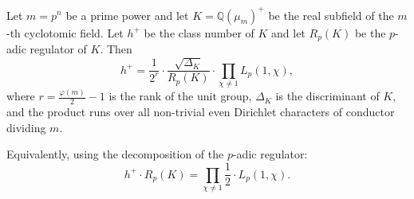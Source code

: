 Let $m = p^n$ be a prime power and let $K = \mathbb{Q}(\mu_m)^+$ be the real subfield of the $m$-th cyclotomic field. Let $h^+$ be the class number of $K$ and let $R_p(K)$ be the $p$-adic regulator of $K$. Then
$$
h^+ = \frac{1}{2^{r}} \cdot \frac{\sqrt{\Delta_K}}{R_p(K)} \cdot \prod_{\chi \neq 1} L_p(1,\chi),
$$
where $r = \frac{\varphi(m)}{2} - 1$ is the rank of the unit group, $\Delta_K$ is the discriminant of $K$, and the product runs over all non-trivial even Dirichlet characters of conductor dividing $m$.

Equivalently, using the decomposition of the $p$-adic regulator:
$$
h^+ \cdot R_p(K) = \prod_{\chi \neq 1} \frac{1}{2} \cdot L_p(1,\chi).
$$
